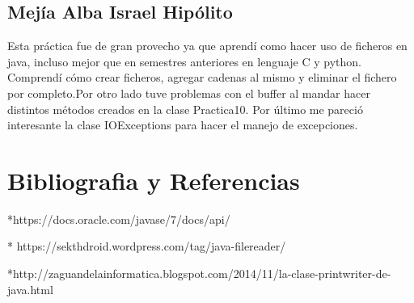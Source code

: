 \documentclass[12pt,letterpaper]{article}
\begin{document}
\subsection*{Mejía Alba Israel Hipólito}
Esta práctica fue de gran provecho ya que aprendí como hacer uso de ficheros en java, incluso mejor que en semestres anteriores en lenguaje C y python. Comprendí cómo crear ficheros, agregar cadenas al mismo y eliminar el fichero por completo.Por otro lado tuve problemas con el buffer al mandar hacer distintos métodos creados en la clase Practica10.
Por último me  pareció interesante  la clase IOExceptions para hacer el manejo de excepciones.  



\section{Bibliografia y Referencias}
*https://docs.oracle.com/javase/7/docs/api/

* https://sekthdroid.wordpress.com/tag/java-filereader/

*http://zaguandelainformatica.blogspot.com/2014/11/la-clase-printwriter-de-java.html
\end{document}
